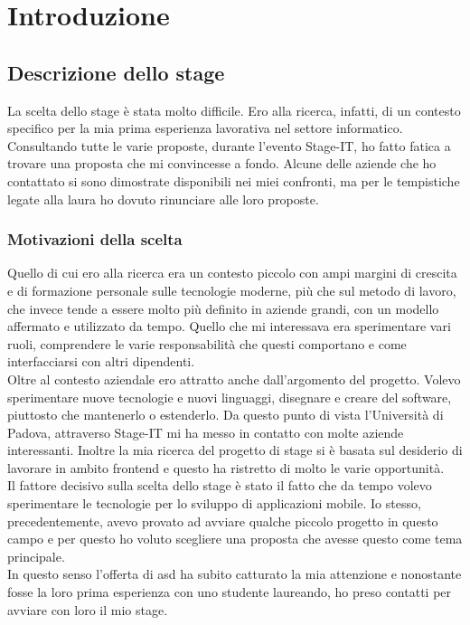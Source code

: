 
\chapter{Introduzione}
\label{cap:introduzione}
\section{Descrizione dello stage}

La scelta dello stage è stata molto difficile. Ero alla ricerca, infatti, di un contesto specifico per la mia prima esperienza lavorativa
nel settore informatico. Consultando tutte le varie proposte, durante l'evento Stage-IT, ho fatto fatica a trovare una proposta che mi
convincesse a fondo. Alcune delle aziende che ho contattato si sono dimostrate disponibili nei miei confronti, ma per le
tempistiche legate alla laura ho dovuto rinunciare alle loro proposte.

\subsection{Motivazioni della scelta}

Quello di cui ero alla ricerca era un contesto piccolo con ampi margini di crescita e di formazione personale sulle tecnologie moderne, più
che sul metodo di lavoro, che invece tende a essere molto più definito in aziende grandi, con un modello affermato e utilizzato da tempo.
Quello che mi interessava era sperimentare vari ruoli, comprendere le varie responsabilità che questi comportano e come interfacciarsi con
altri dipendenti. \\
Oltre al contesto aziendale ero attratto anche dall'argomento del progetto. Volevo sperimentare nuove tecnologie e nuovi linguaggi,
disegnare e creare del software, piuttosto che mantenerlo o estenderlo. Da questo punto di vista l'Università di Padova,
attraverso Stage-IT mi ha messo in contatto con molte aziende interessanti. Inoltre la mia ricerca del progetto di stage si è basata sul desiderio
di lavorare in ambito frontend e questo ha ristretto di molto le varie opportunità. \\
Il fattore decisivo sulla scelta dello stage è stato il fatto che da tempo volevo sperimentare le tecnologie per lo sviluppo di applicazioni
mobile. Io stesso, precedentemente, avevo provato ad avviare qualche piccolo progetto in questo campo e per questo ho voluto
scegliere una proposta che avesse questo come tema principale. \\
In questo senso l'offerta di \acrlong{asd} ha subito catturato la mia attenzione e nonostante fosse la loro prima esperienza con uno
studente laureando, ho preso contatti per avviare con loro il mio stage.


